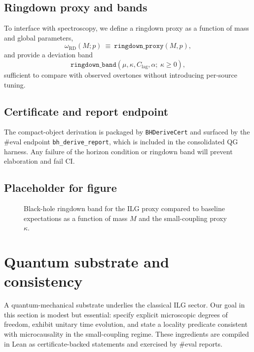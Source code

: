 \documentclass[aps,prd,twocolumn,superscriptaddress,nofootinbib,floatfix,longbibliography]{revtex4-2}
\newcommand{\lean}[1]{\texttt{#1}}
\begin{document}
\subsection{Ringdown proxy and bands}
To interface with spectroscopy, we define a ringdown proxy as a function of mass and global parameters,
\begin{equation}
  \omega_{\mathrm{RD}}(M;p)\ \equiv\ \texttt{ringdown\_proxy}(M,p),
\end{equation}
and provide a deviation band
\begin{equation}
  \texttt{ringdown\_band}(\mu,\kappa,C_{\mathrm{lag}},\alpha;\ \kappa\ge 0),
\end{equation}
sufficient to compare with observed overtones without introducing per-source tuning.

\subsection{Certificate and report endpoint}
The compact-object derivation is packaged by \lean{BHDeriveCert} and surfaced by the \#eval endpoint \lean{bh_derive_report}, which is included in the consolidated QG harness. Any failure of the horizon condition or ringdown band will prevent elaboration and fail CI.

\subsection{Placeholder for figure}
\begin{figure}[t]
  \centering
  \caption{Black-hole ringdown band for the ILG proxy compared to baseline expectations as a function of mass $M$ and the small-coupling proxy $\kappa$.}
  \label{fig:bh-rd}
\end{figure}

\section{Quantum substrate and consistency}\label{sec:quantum}

A quantum-mechanical substrate underlies the classical ILG sector. Our goal in this section is modest but essential: specify explicit microscopic degrees of freedom, exhibit unitary time evolution, and state a locality predicate consistent with microcausality in the small-coupling regime. These ingredients are compiled in Lean as certificate-backed statements and exercised by \#eval reports.
\end{document}
